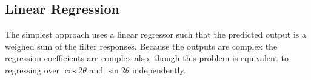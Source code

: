 \documentclass{bmvc2k}
\def\eg{\emph{e.g}\bmvaOneDot}
\def\ie{\emph{i.e}\bmvaOneDot}
\def\dtcwt{DT-$\mathbb{C}$WT}
\newcommand{\comment}[1]{}
\begin{document}
\subsection{Linear Regression}
\label{s:learning_linear}
The simplest approach uses a linear regressor such that the predicted output is a weighed sum of the filter responses. Because the outputs are complex the regression coefficients are complex also, though this problem is equivalent to regressing over $\cos 2\theta$ and $\sin 2\theta$ independently.



%
\end{document}
